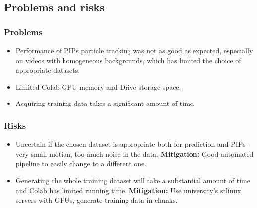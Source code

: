 \documentclass[11pt]{article}
\begin{document}
\subsection{Problems and risks}\label{problems-and-risks}
\subsubsection{Problems}\label{problems}
\begin{itemize}
\itemsep0em
    \item Performance of PIPs particle tracking was not as good as expected, especially on videos with homogeneous backgrounds, which has limited the choice of appropriate datasets.
    \item Limited Colab GPU memory and Drive storage space.
    \item Acquiring training data takes a significant amount of time.
\end{itemize}   

\subsubsection{Risks}\label{risks}
\begin{itemize}
\itemsep0em
    \item Uncertain if the chosen dataset is appropriate both for prediction and PIPs - very small motion, too much noise in the data. \textbf{Mitigation:} Good automated pipeline to easily change to a different one.
    \item Generating the whole training dataset will take a substantial amount of time and Colab has limited running time. \textbf{Mitigation:} Use university's stlinux servers with GPUs, generate training data in chunks.
\end{itemize}  
\end{document}
